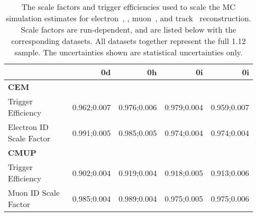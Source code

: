 \begin{table}[h]
\begin{center}
  \caption{\label{table:sf} The scale factors and trigger efficiencies used to scale the MC
    simulation estimates for electron~\cite{CDF8629}, \cite{CDF8614},
    muon~\cite{CDF8618}, and track~\cite{CDF8696} reconstruction. Scale factors are
    run-dependent, and are listed below with the corresponding
    datasets. All datasets together represent the full 1.12\invfb
    sample. The uncertainties shown are statistical uncertainties only.}
\vspace{2mm}
\small
\begin{tabular}{l D{;}{\pm}{-1}D{;}{\pm}{-1}D{;}{\pm}{-1}D{;}{\pm}{-1}}
\toprule
 & {\bf 0d} & {\bf 0h} & {\bf 0i} & {\bf 0i} \\
\midrule
{\bf CEM} & & & & \\
Trigger Efficiency       & 0.962;0.007 & 0.976;0.006 & 0.979;0.004 & 0.959;0.007 \\
Electron ID Scale Factor & 0.991;0.005 & 0.985;0.005 & 0.974;0.004 & 0.974;0.004 \\
\midrule
{\bf CMUP} & & & & \\
Trigger Efficiency       & 0.902;0.004 & 0.919;0.004 & 0.918;0.005 & 0.913;0.006 \\ 
Muon ID Scale Factor     & 0.985;0.004 & 0.989;0.004 & 0.975;0.005 & 0.975;0.006 \\

\end{tabular}
\end{center}
\end{table}
